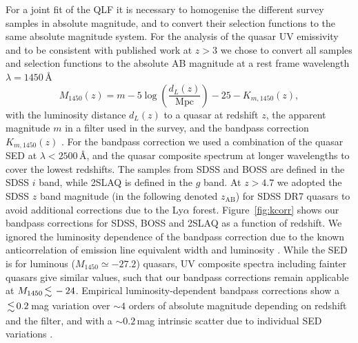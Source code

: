 \documentclass[a4paper,fleqn,usenatbib]{mnras}
\begin{document}
For a joint fit of the QLF it is necessary to homogenise the different
survey samples in absolute magnitude, and to convert their selection
functions to the same absolute magnitude system. For the analysis of
the quasar UV emissivity and to be consistent with published work at
$z>3$ we chose to convert all samples and selection functions to the
absolute AB magnitude at a rest frame wavelength $\lambda=1450$\,\AA
\begin{equation}\label{eq:absmag}
M_{1450}\left(z\right) = m-5\log{\left(\frac{d_L\left(z\right)}{\mathrm{Mpc}}\right)}-25-K_{m,1450}\left(z\right),
\end{equation}
with the luminosity distance $d_L\left(z\right)$ to a quasar at
redshift $z$, the apparent magnitude $m$ in a filter used in the
survey, and the bandpass correction $K_{m,1450}\left(z\right)$
\citep{1956AJ.....61...97H, 1968ApJ...154...21O, 2000A&A...353..861W,
  2002astro.ph.10394H}. For the bandpass correction we used a
combination of the \citet{2015MNRAS.449.4204L} quasar SED at
$\lambda<2500$\,\AA, and the \citet{2001AJ....122..549V} quasar
composite spectrum at longer wavelengths to cover the lowest
redshifts.  The samples from SDSS and BOSS are defined in the SDSS $i$
band, while 2SLAQ is defined in the $g$ band. At $z>4.7$ we adopted
the SDSS $z$ band magnitude (in the following denoted $z_\mathrm{AB}$)
for SDSS DR7 quasars to avoid additional corrections due to the
Ly$\alpha$ forest. Figure~\ref{fig:kcorr} shows our bandpass
corrections for SDSS, BOSS and 2SLAQ as a function of redshift. We
ignored the luminosity dependence of the bandpass correction due to
the known anticorrelation of emission line equivalent width and
luminosity \citep{1977ApJ...214..679B}.  While the
\citet{2015MNRAS.449.4204L} SED is for luminous ($M_{1450}\simeq
-27.2$) quasars, UV composite spectra including fainter quasars
\citep{2002ApJ...565..773T, 2012ApJ...752..162S, 2014ApJ...794...75S}
give similar values, such that our bandpass corrections remain
applicable at $M_{1450}\la -24$. Empirical luminosity-dependent
bandpass corrections show a $\la 0.2$\,mag variation over $\sim 4$
orders of absolute magnitude depending on redshift and the filter, and
with a $\sim 0.2$\,mag intrinsic scatter due to individual SED
variations \citep{2013ApJ...773...14R, 2013ApJ...768..105M,
  2013A&A...551A..29P}.
\end{document}
